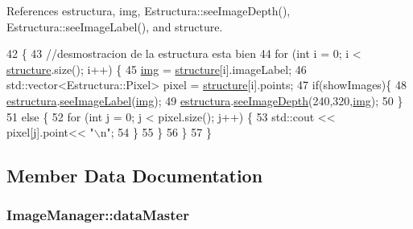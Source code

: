 References estructura, img, Estructura\+::see\+Image\+Depth(), Estructura\+::see\+Image\+Label(), and structure.


\begin{DoxyCode}
42                                                 \{
43     \textcolor{comment}{//desmostracion de la estructura esta bien}
44     \textcolor{keywordflow}{for} (\textcolor{keywordtype}{int} i = 0; i < \hyperlink{classImageManager_a9a2da56c0a4aa3d4cdebdea45d81cca7}{structure}.size(); i++) \{
45         \hyperlink{classImageManager_ae096d2db43b8d7efe508ff68b987e992}{img} = \hyperlink{classImageManager_a9a2da56c0a4aa3d4cdebdea45d81cca7}{structure}[i].imageLabel;  
46         std::vector<Estructura::Pixel> pixel = \hyperlink{classImageManager_a9a2da56c0a4aa3d4cdebdea45d81cca7}{structure}[i].points; 
47         \textcolor{keywordflow}{if}(showImages)\{
48             \hyperlink{classImageManager_a9d328384bb5a1e13d0a50aefea3680cf}{estructura}.\hyperlink{classEstructura_a4d6f678e0c5a5f2df96b50064304eec1}{seeImageLabel}(\hyperlink{classImageManager_ae096d2db43b8d7efe508ff68b987e992}{img});
49             \hyperlink{classImageManager_a9d328384bb5a1e13d0a50aefea3680cf}{estructura}.\hyperlink{classEstructura_a64b30b9326081ddd31ea330c4036cf5a}{seeImageDepth}(240,320,\hyperlink{classImageManager_ae096d2db43b8d7efe508ff68b987e992}{img});
50         \}
51         \textcolor{keywordflow}{else} \{
52             \textcolor{keywordflow}{for} (\textcolor{keywordtype}{int} j = 0; j < pixel.size(); j++) \{
53                 std::cout <<  pixel[j].point<< \textcolor{stringliteral}{"\(\backslash\)n"};
54             \}
55         \}    
56     \}
57 \}
\end{DoxyCode}


\subsection{Member Data Documentation}
\subsubsection[{\texorpdfstring{data\+Master}{dataMaster}}]{ Image\+Manager\+::data\+Master\hspace{0.3cm}{\ttfamily [private]}}\hypertarget{classImageManager_aa07e129af2fa348547c99843c0058c2b}{}\label{classImageManager_aa07e129af2fa348547c99843c0058c2b}


